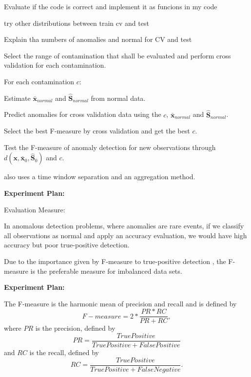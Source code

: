 \documentclass[review]{elsarticle}
\begin{document}
Evaluate if the code is correct and implement it as funcions in my code

try other distributions between train cv and test

Explain tha numbers of anomalies and normal for CV and test

Select the range of contamination that shall be evaluated and perform cross validation for each contamination. 

For each contamination $c$:

Estimate $\boldsymbol{\bar{x}}_{normal}$ and $\boldsymbol{\hat{S}}_{normal}$ from normal data.

Predict anomalies for cross validation data using the $c$, $\boldsymbol{\bar{x}}_{normal}$ and $\boldsymbol{\hat{S}}_{normal}$.

Select the best F-measure by cross validation and get the best $c$.

Test the F-measure of anomaly detection for new observations through $d(\boldsymbol{x},\bar{\boldsymbol{x}}_0, \boldsymbol{\hat{S}}_0)$ and $c$.

\cite{garcia2014empirical} also uses a time window separation and an aggregation method.

\textbf{Experiment Plan:}

Evaluation Measure:

In anomalous detection problems, where anomalies are rare events, if we classify all observations as normal and apply an accuracy evaluation, we would have high accuracy but poor true-positive detection.

Due to the importance given by F-measure to true-positive detection \cite{powers2011evaluation,moustafa2019holistic}, the F-measure is the preferable measure for imbalanced data sets.

\textbf{Experiment Plan:}

	The F-measure is the harmonic mean of precision and recall and is defined by 
	\begin{equation}\label{eq:eq15}
		F-measure = 2 * \frac{PR * RC}{PR + RC},				
	\end{equation}
	where $PR$ is the precision, defined by 
	\begin{equation}\label{eq:eq16}
		PR = \frac{True Positive}{True Positive + False Positive}
	\end{equation}
	and $RC$ is the recall, defined by 
	\begin{equation}\label{eq:eq17}
		RC = \frac{True Positive}{True Positive + False Negative}.
	\end{equation}
\end{document}
